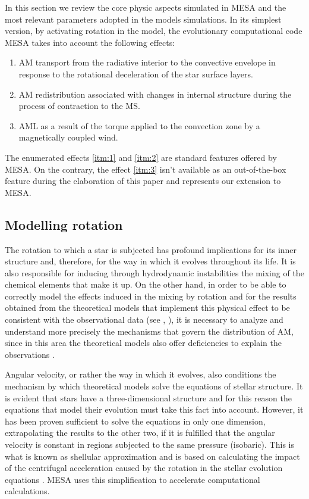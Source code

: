 \documentclass[fleqn,usenatbib]{mnras}
\begin{document}
In this section we review the core physic aspects simulated in MESA and the most relevant parameters adopted in the models simulations. In its simplest version, by activating rotation in the model, the evolutionary computational code MESA takes into account the following effects:
\begin{enumerate}
    \item AM transport from the radiative interior to the convective envelope in response to the rotational deceleration of the star surface layers\label{itm:1}.
    \item AM redistribution associated with changes in internal structure during the process of contraction to the MS\label{itm:2}.
    \item AML as a result of the torque applied to the convection zone by a magnetically coupled wind\label{itm:3}.
\end{enumerate}

The enumerated effects \ref{itm:1} and \ref{itm:2} are standard features offered by MESA. On the contrary, the effect \ref{itm:3} isn't available as an out-of-the-box feature during the elaboration of this paper and represents our extension to MESA.

\subsection{Modelling rotation}
The rotation to which a star is subjected has profound implications for its inner structure and, therefore, for the way in which it evolves throughout its life. It is also responsible for inducing through hydrodynamic instabilities the mixing of the chemical elements that make it up. On the other hand, in order to be able to correctly model the effects induced in the mixing by rotation and for the results obtained from the theoretical models that implement this physical effect to be consistent with the observational data (see \citet{Pinsonneault1997}, \citet{Maeder2000}), it is necessary to analyze and understand more precisely the mechanisms that govern the distribution of AM, since in this area the theoretical models also offer deficiencies to explain the observations \citep{Denissenkov2007}. \par

Angular velocity, or rather the way in which it evolves, also conditions the mechanism by which theoretical models solve the equations of stellar structure. It is evident that stars have a three-dimensional structure and for this reason the equations that model their evolution must take this fact into account. However, it has been proven sufficient to solve the equations in only one dimension, extrapolating the results to the other two, if it is fulfilled that the angular velocity is constant in regions subjected to the same pressure (isobaric). This is what is known as shellular approximation \citep{Meynet1997} and is based on calculating the impact of the centrifugal acceleration caused by the rotation in the stellar evolution equations \citep{Endal1976}. MESA uses this simplification to accelerate computational calculations.\par
\end{document}
